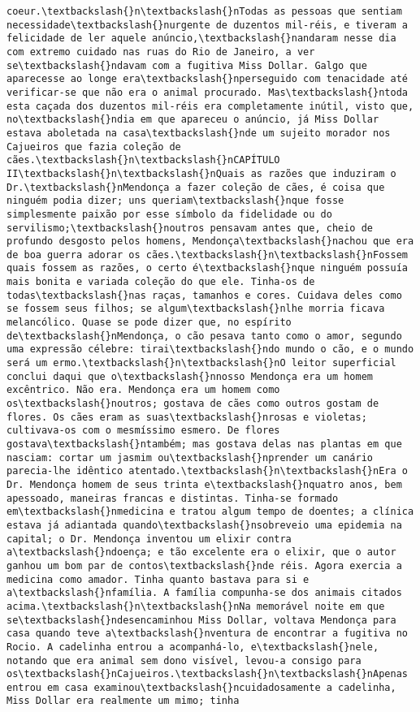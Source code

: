 \documentclass[11pt]{article}
\begin{document}
\begin{Verbatim}[commandchars=\\\{\}]
coeur.\textbackslash{}n\textbackslash{}nTodas as pessoas que sentiam necessidade\textbackslash{}nurgente de duzentos mil-réis, e tiveram a felicidade de ler aquele anúncio,\textbackslash{}nandaram nesse dia com extremo cuidado nas ruas do Rio de Janeiro, a ver se\textbackslash{}ndavam com a fugitiva Miss Dollar. Galgo que aparecesse ao longe era\textbackslash{}nperseguido com tenacidade até verificar-se que não era o animal procurado. Mas\textbackslash{}ntoda esta caçada dos duzentos mil-réis era completamente inútil, visto que, no\textbackslash{}ndia em que apareceu o anúncio, já Miss Dollar estava aboletada na casa\textbackslash{}nde um sujeito morador nos Cajueiros que fazia coleção de cães.\textbackslash{}n\textbackslash{}nCAPÍTULO II\textbackslash{}n\textbackslash{}nQuais as razões que induziram o Dr.\textbackslash{}nMendonça a fazer coleção de cães, é coisa que ninguém podia dizer; uns queriam\textbackslash{}nque fosse simplesmente paixão por esse símbolo da fidelidade ou do servilismo;\textbackslash{}noutros pensavam antes que, cheio de profundo desgosto pelos homens, Mendonça\textbackslash{}nachou que era de boa guerra adorar os cães.\textbackslash{}n\textbackslash{}nFossem quais fossem as razões, o certo é\textbackslash{}nque ninguém possuía mais bonita e variada coleção do que ele. Tinha-os de todas\textbackslash{}nas raças, tamanhos e cores. Cuidava deles como se fossem seus filhos; se algum\textbackslash{}nlhe morria ficava melancólico. Quase se pode dizer que, no espírito de\textbackslash{}nMendonça, o cão pesava tanto como o amor, segundo uma expressão célebre: tirai\textbackslash{}ndo mundo o cão, e o mundo será um ermo.\textbackslash{}n\textbackslash{}nO leitor superficial conclui daqui que o\textbackslash{}nnosso Mendonça era um homem excêntrico. Não era. Mendonça era um homem como os\textbackslash{}noutros; gostava de cães como outros gostam de flores. Os cães eram as suas\textbackslash{}nrosas e violetas; cultivava-os com o mesmíssimo esmero. De flores gostava\textbackslash{}ntambém; mas gostava delas nas plantas em que nasciam: cortar um jasmim ou\textbackslash{}nprender um canário parecia-lhe idêntico atentado.\textbackslash{}n\textbackslash{}nEra o Dr. Mendonça homem de seus trinta e\textbackslash{}nquatro anos, bem apessoado, maneiras francas e distintas. Tinha-se formado em\textbackslash{}nmedicina e tratou algum tempo de doentes; a clínica estava já adiantada quando\textbackslash{}nsobreveio uma epidemia na capital; o Dr. Mendonça inventou um elixir contra a\textbackslash{}ndoença; e tão excelente era o elixir, que o autor ganhou um bom par de contos\textbackslash{}nde réis. Agora exercia a medicina como amador. Tinha quanto bastava para si e a\textbackslash{}nfamília. A família compunha-se dos animais citados acima.\textbackslash{}n\textbackslash{}nNa memorável noite em que se\textbackslash{}ndesencaminhou Miss Dollar, voltava Mendonça para casa quando teve a\textbackslash{}nventura de encontrar a fugitiva no Rocio. A cadelinha entrou a acompanhá-lo, e\textbackslash{}nele, notando que era animal sem dono visível, levou-a consigo para os\textbackslash{}nCajueiros.\textbackslash{}n\textbackslash{}nApenas entrou em casa examinou\textbackslash{}ncuidadosamente a cadelinha, Miss Dollar era realmente um mimo; tinha 
\end{Verbatim}
\end{document}
